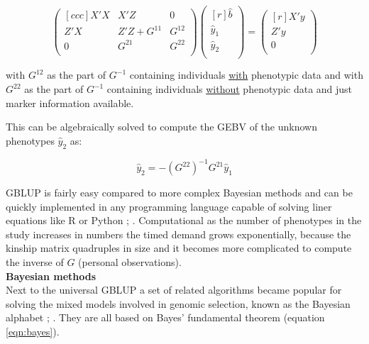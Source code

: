 \begin{equation}
 \begin{pmatrix}[ccc]
  X'X & X'Z & 0 \\ 
  Z'X & Z'Z + G^{11} & G^{12} \\ 
  0 & G^{21} & G^{22} \\ 
 \end{pmatrix}
 \begin{pmatrix}[r]
  \hat{b} \\ 
  \hat{y}_1 \\ 
  \hat{y}_2 \\ 
 \end{pmatrix}
 =
 \begin{pmatrix}[r]
  X'y \\ 
  Z'y \\ 
  0 \\ 
 \end{pmatrix}
 \label{eqn:pBLUP}
\end{equation}

with $G^{12}$ as the part of $G^{-1}$ containing individuals \underline{with} phenotypic data and with
$G^{22}$ as the part of $G^{-1}$ containing individuals \underline{without} phenotypic data and just
marker information available.

This can be algebraically solved to compute the GEBV of the unknown phenotypes $\hat{y}_2$  as:

\begin{equation}
\hat{y}_2 = -\left( G^{22}\right)^{-1}G^{21}\hat{y}_1
\label{eqn:gpred}
\end{equation}

GBLUP is fairly easy compared to more complex Bayesian methods and can be quickly implemented in any
programming language capable of solving liner equations like R or Python \cite{CRAN};
\cite{van1995python}. Computational as the number of phenotypes in the study increases in numbers
the timed demand grows exponentially, because the kinship matrix quadruples in size and
it becomes more complicated to compute the inverse of $G$ (personal observations). \\

\noindent
\textbf{Bayesian methods} \\ 

Next to the universal GBLUP a set of related algorithms became popular for solving the mixed models
involved in genomic selection, known as the Bayesian alphabet \cite{gianola2009};
\cite{gianola2013}. They are all based on Bayes' fundamental theorem (equation \ref{eqn:bayes}).

